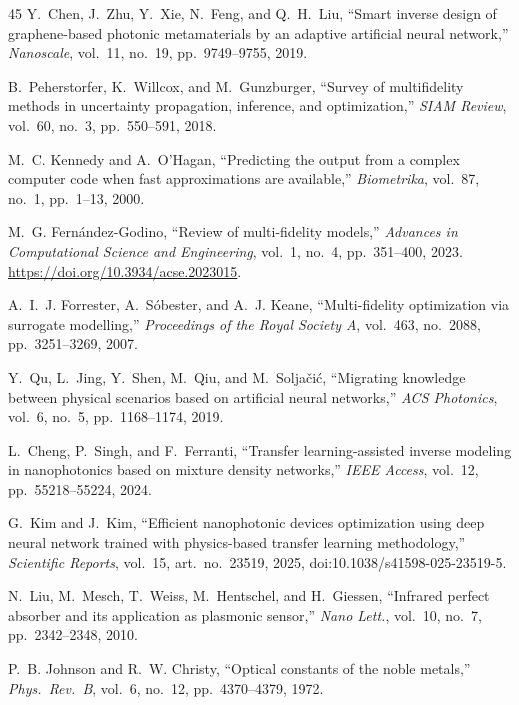 \documentclass[a4paper,fleqn]{cas-sc}
\begin{document}
\begin{thebibliography}{45}
Y.~Chen, J.~Zhu, Y.~Xie, N.~Feng, and Q.~H.~Liu, ``Smart inverse design of graphene-based photonic metamaterials by an adaptive artificial neural network,'' \textit{Nanoscale}, vol.~11, no.~19, pp.~9749--9755, 2019.

B.~Peherstorfer, K.~Willcox, and M.~Gunzburger, ``Survey of multifidelity methods in uncertainty propagation, inference, and optimization,'' \textit{SIAM Review}, vol.~60, no.~3, pp.~550--591, 2018.

M.~C. Kennedy and A.~O'Hagan, ``Predicting the output from a complex computer code when fast approximations are available,'' \textit{Biometrika}, vol.~87, no.~1, pp.~1--13, 2000.

M.~G. Fern\'{a}ndez-Godino, ``Review of multi-fidelity models,'' \textit{Advances in Computational Science and Engineering}, vol.~1, no.~4, pp.~351--400, 2023. \url{https://doi.org/10.3934/acse.2023015}.

A.~I.~J. Forrester, A.~S\'{o}bester, and A.~J. Keane, ``Multi-fidelity optimization via surrogate modelling,'' \textit{Proceedings of the Royal Society A}, vol.~463, no.~2088, pp.~3251--3269, 2007.

Y.~Qu, L.~Jing, Y.~Shen, M.~Qiu, and M.~Solja\v{c}i\'{c}, ``Migrating knowledge between physical scenarios based on artificial neural networks,'' \textit{ACS Photonics}, vol.~6, no.~5, pp.~1168--1174, 2019.

L.~Cheng, P.~Singh, and F.~Ferranti, ``Transfer learning-assisted inverse modeling in nanophotonics based on mixture density networks,'' \textit{IEEE Access}, vol.~12, pp.~55218--55224, 2024.

G.~Kim and J.~Kim, ``Efficient nanophotonic devices optimization using deep neural network trained with physics-based transfer learning methodology,'' \textit{Scientific Reports}, vol.~15, art.~no.~23519, 2025, doi:10.1038/s41598-025-23519-5.

N.~Liu, M.~Mesch, T.~Weiss, M.~Hentschel, and H.~Giessen, ``Infrared perfect absorber and its application as plasmonic sensor,'' \textit{Nano Lett.}, vol.~10, no.~7, pp.~2342--2348, 2010.

P.~B. Johnson and R.~W. Christy, ``Optical constants of the noble metals,'' \textit{Phys.~Rev.~B}, vol.~6, no.~12, pp.~4370--4379, 1972.


\end{thebibliography}
\end{document}
